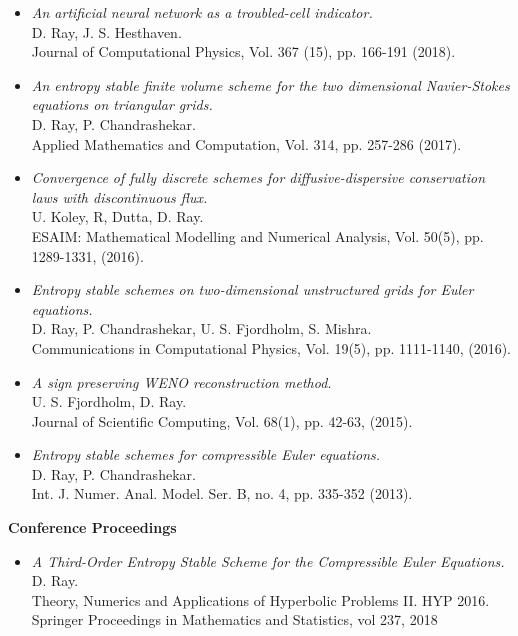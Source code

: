 \documentclass[margin]{res}
\begin{document}
\begin{resume}
\begin{itemize}
           \item {\it An artificial neural network as a troubled-cell indicator.}\\
            D. Ray, J. S. Hesthaven.\\
            Journal of Computational Physics, Vol. 367 (15), pp. 166-191 (2018).

            \item {\it An entropy stable finite volume scheme for the two dimensional Navier-Stokes equations on triangular grids.}\\
            D. Ray, P. Chandrashekar.\\
             Applied Mathematics and Computation, Vol. 314, pp. 257-286 (2017).

             \item {\it Convergence of fully discrete schemes for diffusive-dispersive conservation laws with discontinuous flux.}\\
              U. Koley, R, Dutta, D. Ray. \\
              ESAIM: Mathematical Modelling and Numerical Analysis, Vol. 50(5), pp. 1289-1331, (2016).
              
              \item {\it Entropy stable schemes on two-dimensional unstructured grids for Euler equations.}\\
              D. Ray, P. Chandrashekar, U. S. Fjordholm, S. Mishra. \\
              Communications in Computational Physics, Vol. 19(5), pp. 1111-1140, (2016).
            
              \item {\it A sign preserving WENO reconstruction method.}\\
              U. S. Fjordholm, D. Ray. \\
              Journal of Scientific Computing, Vol. 68(1), pp. 42-63, (2015).
             
              \item {\it Entropy stable schemes for compressible Euler equations.}\\
              D. Ray, P. Chandrashekar.\\
              Int. J. Numer. Anal. Model. Ser. B, no. 4, pp. 335-352 (2013).
             \end{itemize}



\textbf{Conference Proceedings}                
            \begin{itemize}           
              \item {\it A Third-Order Entropy Stable Scheme for the Compressible Euler Equations.}\\
              D. Ray.\\
              Theory, Numerics and Applications of Hyperbolic Problems II. HYP 2016. Springer Proceedings in Mathematics and Statistics, vol 237, 2018


\end{itemize}
\end{resume}
\end{document}
